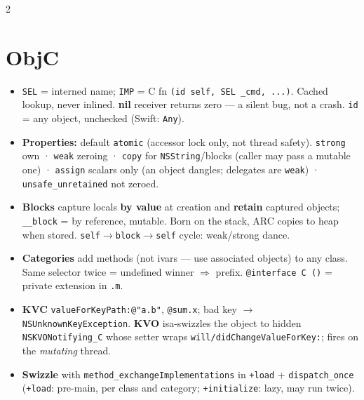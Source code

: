 \documentclass[8pt]{extarticle}
\begin{document}

\begin{multicols}{2}
\raggedright

\section{ObjC}
\begin{itemize}
  \item \texttt{SEL} = interned name; \texttt{IMP} = C fn
        \texttt{(id self, SEL \_cmd, ...)}. Cached lookup, never inlined.
        \textbf{nil} receiver returns zero — a silent bug, not a crash.
        \texttt{id} = any object, unchecked (Swift: \texttt{Any}).
  \item \textbf{Properties:} default \texttt{atomic} (accessor lock only, not
        thread safety). \texttt{strong} own · \texttt{weak} zeroing ·
        \texttt{copy} for \texttt{NSString}/blocks (caller may pass a mutable
        one) · \texttt{assign} scalars only (an object dangles; delegates are
        \texttt{weak}) · \texttt{unsafe\_unretained} not zeroed.
  \item \textbf{Blocks} capture locals \textbf{by value} at creation and
        \textbf{retain} captured objects; \texttt{\_\_block} = by reference,
        mutable. Born on the stack, ARC copies to heap when stored.
        \texttt{self$\to$block$\to$self} cycle: weak/strong dance.
  \item \textbf{Categories} add methods (not ivars — use associated objects)
        to any class. Same selector twice = undefined winner $\Rightarrow$
        prefix. \texttt{@interface C ()} = private extension in \texttt{.m}.
  \item \textbf{KVC} \texttt{valueForKeyPath:@"a.b"}, \texttt{@sum.x};
        bad key $\to$ \texttt{NSUnknownKeyException}. \textbf{KVO}
        isa-swizzles the object to hidden \texttt{NSKVONotifying\_C} whose
        setter wraps \texttt{will/didChangeValueForKey:}; fires on the
        \emph{mutating} thread.
  \item \textbf{Swizzle} with \texttt{method\_exchangeImplementations} in
        \texttt{+load} + \texttt{dispatch\_once} (\texttt{+load}: pre-main,
        per class and category; \texttt{+initialize}: lazy, may run twice).
\end{itemize}


\end{multicols}
\end{document}
